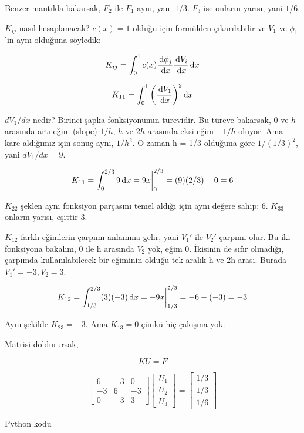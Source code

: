 \documentclass[12pt,fleqn]{article}\usepackage{../../common}
\begin{document}
Benzer mantıkla bakarsak, $F_2$ ile $F_1$ aynı, yani $1/3$. $F_3$ ise
onların yarısı, yani $1/6$.

$K_{ij}$ nasıl hesaplanacak? $c(x) = 1$ olduğu için formülden
çıkarılabilir ve $V_1$ ve $\phi_1$'in aynı olduğuna söyledik:

$$ K_{ij} = \int_0^1 c(x) \frac{\,\mathrm{d}\phi_j}{\,\mathrm{d} x} \frac{\,\mathrm{d} V_i}{\,\mathrm{d} x} \,\mathrm{d} x $$

$$ K_{11} = \int_0^1 \bigg( \frac{\,\mathrm{d} V_1}{\,\mathrm{d} x} \bigg) ^2 \,\mathrm{d} x  $$

$dV_1/dx$ nedir? Birinci şapka fonksiyonunun türevidir. Bu türeve
bakarsak, $0$ ve $h$ arasında artı eğim (slope) $1/h$, $h$ ve $2h$
arasında eksi eğim $-1/h$ oluyor. Ama kare aldığımız için sonuç aynı,
$1/h^2$. O zaman h = 1/3 olduğuna göre $1/(1/3)^2$, yani $dV_1/dx =
9$.

$$ K_{11} = \int_0^{2/3} 9 \,\mathrm{d} x = 9x \bigg|_0^{2/3} = (9)(2/3) - 0 = 6 $$

$K_{22}$ şeklen aynı fonksiyon parçasını temel aldığı için aynı değere
sahip: 6. $K_{33}$ onların yarısı, eşittir 3.

$K_{12}$ farklı eğimlerin çarpımı anlamına gelir, yani $V_1'$ ile
$V_2'$ çarpımı olur. Bu iki fonksiyona bakalım, 0 ile h arasında $V_2$
yok, eğim 0. İkisinin de sıfır olmadığı, çarpımda kullanılabilecek bir
eğiminin olduğu tek aralık h ve 2h arası. Burada $V_1' = -3, V_2 = 3$.

$$
K_{12} = \int_{1/3}^{2/3} (3)(-3) \,\mathrm{d} x
= -9x \bigg|_{1/3}^{2/3} = -6 - (-3) = -3
$$

Aynı şekilde $K_{23} = -3$. Ama $K_{13} = 0$ çünkü hiç çakışma yok.

Matrisi doldurursak, 

$$
KU = F
$$

$$ 
\left[\begin{array}{ccc}
    6 & -3 & 0 \\
    -3 & 6 & -3 \\
    0 & -3 & 3     
\end{array}\right]
\left[\begin{array}{c}
    U_1 \\
    U_2 \\
    U_3
\end{array}\right]
=
\left[\begin{array}{c}
    1/3 \\
    1/3 \\
    1/6
\end{array}\right]
$$

Python kodu 
\end{document}
